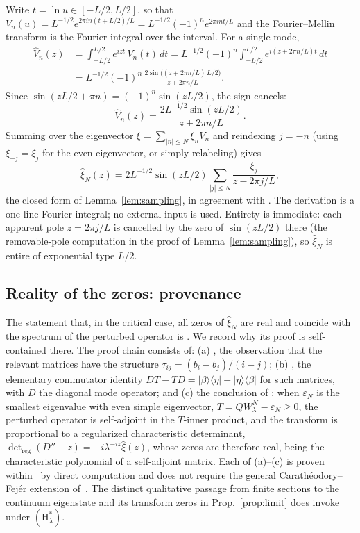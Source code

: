\documentclass[11pt,a4paper]{article}
\begin{document}
Write $t=\ln u\in[-L/2,L/2]$, so that
$V_n(u)=L^{-1/2}e^{2\pi i n(t+L/2)/L}=L^{-1/2}(-1)^n e^{2\pi i nt/L}$ and the
Fourier--Mellin transform is the Fourier integral over the interval. For a
single mode,
\begin{align*}
  \widehat V_n(z)&=\int_{-L/2}^{L/2}e^{izt}\,V_n(t)\,dt
  =L^{-1/2}(-1)^n\int_{-L/2}^{L/2}e^{i(z+2\pi n/L)t}\,dt\\
  &=L^{-1/2}(-1)^n\,\frac{2\sin\!\bigl((z+2\pi n/L)\,L/2\bigr)}{z+2\pi n/L}.
\end{align*}
Since $\sin(zL/2+\pi n)=(-1)^n\sin(zL/2)$, the sign cancels:
\[
  \widehat V_n(z)=\frac{2L^{-1/2}\sin(zL/2)}{z+2\pi n/L}.
\]
Summing over the eigenvector $\xi=\sum_{|n|\le N}\xi_n V_n$ and reindexing
$j=-n$ (using $\xi_{-j}=\xi_j$ for the even eigenvector, or simply relabeling)
gives
\[
  \widehat\xi_N(z)=2L^{-1/2}\sin(zL/2)\sum_{|j|\le N}\frac{\xi_j}{z-2\pi j/L},
\]
the closed form of Lemma~\ref{lem:sampling}, in agreement with
\cite[Prop.~5.9]{CCM2025}. The derivation is a one-line Fourier integral; no
external input is used. Entirety is immediate: each apparent pole
$z=2\pi j/L$ is cancelled by the zero of $\sin(zL/2)$ there (the removable-pole
computation in the proof of Lemma~\ref{lem:sampling}), so $\widehat\xi_N$ is
entire of exponential type $L/2$.

\subsection{Reality of the zeros: provenance}\label{app:reality}

The statement that, in the critical case, all zeros of $\widehat\xi_N$ are real
and coincide with the spectrum of the perturbed operator is
\cite[Thm.~5.10]{CCM2025}. We record why its proof is self-contained there.
The proof chain consists of: (a) \cite[Lem.~5.2]{CCM2025}, the observation that
the relevant matrices have the structure $\tau_{ij}=(b_i-b_j)/(i-j)$; (b)
\cite[Lem.~5.4]{CCM2025}, the elementary commutator identity
$DT-TD=|\beta\rangle\langle\eta|-|\eta\rangle\langle\beta|$ for such matrices,
with $D$ the diagonal mode operator; and (c) the conclusion of
\cite[Thm.~5.10]{CCM2025}: when $\varepsilon_N$ is the smallest eigenvalue with
even simple eigenvector, $T=QW^N_\lambda-\varepsilon_N\ge0$, the perturbed
operator is self-adjoint in the $T$-inner product, and the transform is
proportional to a regularized characteristic determinant,
$\det_{\mathrm{reg}}(D''-z)=-i\lambda^{-iz}\widehat\xi(z)$, whose zeros are
therefore real, being the characteristic polynomial of a self-adjoint matrix. Each
of (a)--(c) is proven within~\cite{CCM2025} by direct computation and does not
require the general Carath\'eodory--Fej\'er extension of~\cite{CvS2025}. The
distinct qualitative passage from finite sections to the continuum eigenstate
and its transform zeros in Prop.~\ref{prop:limit} does invoke
\cite[Thm.~6.1]{CvS2025} under $(\mathrm{H}_\lambda^\ast)$.
\end{document}

